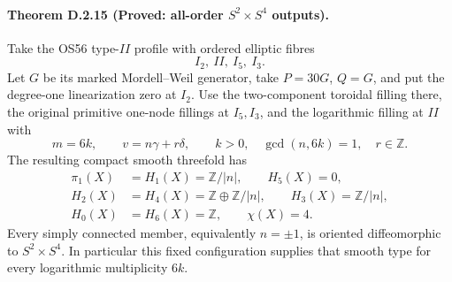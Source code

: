 \paragraph{Theorem D.2.15 (Proved: all-order $S^2\times S^4$ outputs).}
Take the OS56 type-$II$ profile with ordered elliptic fibres
\[
                         I_2,\ II,\ I_5,\ I_3.
\]
Let $G$ be its marked Mordell--Weil generator, take
$P=30G$, $Q=G$, and put the degree-one linearization zero
at $I_2$. Use the two-component toroidal filling there,
the original primitive one-node fillings at $I_5,I_3$,
and the logarithmic filling at $II$ with
\[
 m=6k,\qquad v=n\gamma+r\delta,\qquad
 k>0,\quad\gcd(n,6k)=1,\quad r\in\mathbb Z.
\]
The resulting compact smooth threefold has
\[
\begin{aligned}
 \pi_1(X)&=H_1(X)=\mathbb Z/|n|,\qquad H_5(X)=0,\\
 H_2(X)&=H_4(X)=\mathbb Z\oplus\mathbb Z/|n|,
 \qquad H_3(X)=\mathbb Z/|n|,\\
 H_0(X)&=H_6(X)=\mathbb Z,\qquad \chi(X)=4.
\end{aligned}
\]
Every simply connected member, equivalently $n=\pm1$,
is oriented diffeomorphic to $S^2\times S^4$.
In particular this fixed configuration supplies that
smooth type for every logarithmic multiplicity $6k$.
